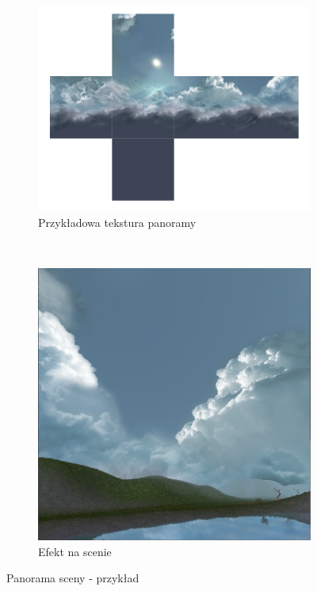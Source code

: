 \documentclass[a4paper,twoside,12pt]{book}
\begin{document}
\begin{figure}[H]
    \centering
    \begin{subfigure}[b]{0.475\textwidth}
        \includegraphics[width=\textwidth]{res/skybox_texture.png}
        \caption{Przykładowa tekstura panoramy}
        \label{fig:skybox_texture}
    \end{subfigure}
    ~ %
    \begin{subfigure}[b]{0.475\textwidth}
        \includegraphics[width=\textwidth]{res/skybox_scene.png}
        \caption{Efekt na scenie}
        \label{fig:skybox_scene}
    \end{subfigure}
    \caption{Panorama sceny - przykład}
    \label{fig:skybox_example}
\end{figure}
\end{document}
